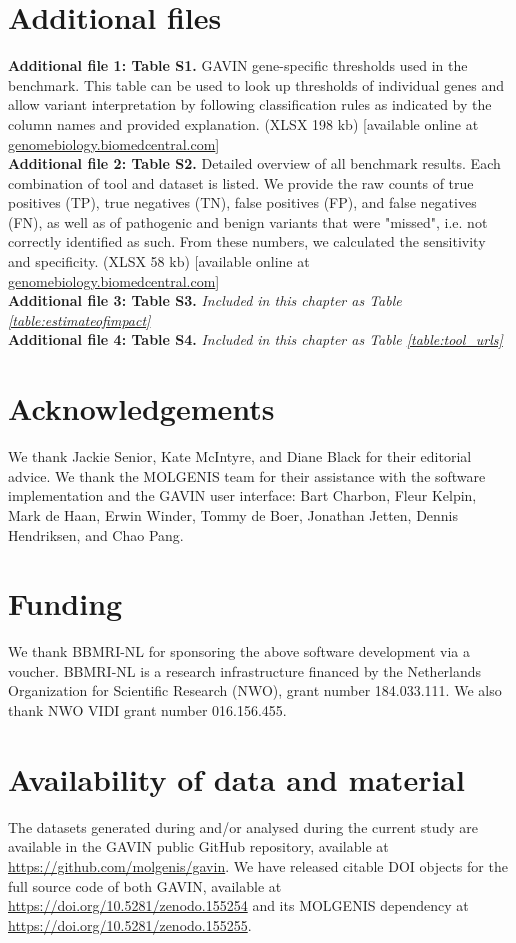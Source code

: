 \section*{Additional files}
\textbf{Additional file 1: Table S1.} GAVIN gene-specific thresholds used in the benchmark.
This table can be used to look up thresholds of individual genes and allow variant interpretation by following classification rules as indicated by the column names and provided explanation.
(XLSX 198 kb) [available online at \url{genomebiology.biomedcentral.com}]\\
\textbf{Additional file 2: Table S2.} Detailed overview of all benchmark results.
Each combination of tool and dataset is listed. We provide the raw counts of true positives (TP), true negatives (TN), false positives (FP), and false negatives (FN), as well as of pathogenic and benign variants that were "missed", i.e. not correctly identified as such.
From these numbers, we calculated the sensitivity and specificity.
(XLSX 58 kb) [available online at \url{genomebiology.biomedcentral.com}]\\
\textbf{Additional file 3: Table S3.} \textsl{Included in this chapter as Table \ref{table:estimateofimpact}}\\
\textbf{Additional file 4: Table S4.} \textsl{Included in this chapter as Table \ref{table:tool_urls}}

\section*{Acknowledgements}
We thank Jackie Senior, Kate McIntyre, and Diane Black for their editorial advice.
We thank the MOLGENIS team for their assistance with the software implementation and the GAVIN user interface: Bart Charbon, Fleur Kelpin, Mark de Haan, Erwin Winder, Tommy de Boer, Jonathan Jetten, Dennis Hendriksen, and Chao Pang.

\section*{Funding}
We thank BBMRI-NL for sponsoring the above software development via a voucher.
BBMRI-NL is a research infrastructure financed by the Netherlands Organization for Scientific Research (NWO), grant number 184.033.111.
We also thank NWO VIDI grant number 016.156.455.

\section*{Availability of data and material}
The datasets generated during and/or analysed during the current study are available in the GAVIN public GitHub repository, available at \url{https://github.com/molgenis/gavin}.
We have released citable DOI objects for the full source code of both GAVIN, available at \url{https://doi.org/10.5281/zenodo.155254} and its MOLGENIS dependency at \url{https://doi.org/10.5281/zenodo.155255}.

